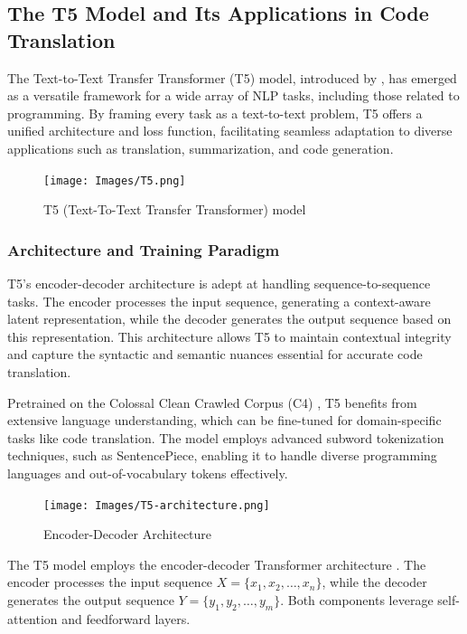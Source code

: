 \documentclass{dhbenelux}
\begin{document}
\subsection{The T5 Model and Its Applications in Code Translation}

The Text-to-Text Transfer Transformer (T5) model, introduced by \cite{kyle2021}, has emerged as a versatile framework for a wide array of NLP tasks, including those related to programming. By framing every task as a text-to-text problem, T5 offers a unified architecture and loss function, facilitating seamless adaptation to diverse applications such as translation, summarization, and code generation.

\begin{figure}[h]
\centering
\texttt{[image: Images/T5.png]}
\caption{T5 (Text-To-Text Transfer Transformer) model}
\label{fig:t5-model}
\end{figure}


\subsubsection{Architecture and Training Paradigm}

T5's encoder-decoder architecture is adept at handling sequence-to-sequence tasks. The encoder processes the input sequence, generating a context-aware latent representation, while the decoder generates the output sequence based on this representation. This architecture allows T5 to maintain contextual integrity and capture the syntactic and semantic nuances essential for accurate code translation.

Pretrained on the Colossal Clean Crawled Corpus (C4) \cite{t52019}, T5 benefits from extensive language understanding, which can be fine-tuned for domain-specific tasks like code translation. The model employs advanced subword tokenization techniques, such as SentencePiece, enabling it to handle diverse programming languages and out-of-vocabulary tokens effectively.

\begin{figure}[h]
\centering
\texttt{[image: Images/T5-architecture.png]}
\caption{Encoder-Decoder Architecture}
\label{fig:encoder-decoder-architecture}
\end{figure}

The T5 model employs the encoder-decoder Transformer architecture \cite{kyle2021}. The encoder processes the input sequence $X = \{x_1, x_2, \dots, x_n\}$, while the decoder generates the output sequence $Y = \{y_1, y_2, \dots, y_m\}$. Both components leverage self-attention and feedforward layers.
\end{document}
